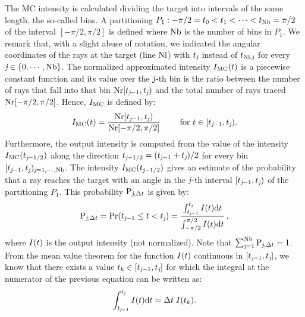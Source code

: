 The MC intensity is calculated dividing the target into intervals of the same length, the so-called bins. A partitioning
$P_1: -\pi/2 = t_{0}<t_{1}<\cdots <t_{\textrm{Nb}}=\pi/2$ of the interval $[-\pi/2, \pi/2]$ is defined where $\textrm{Nb}$ is the number of bins in $P_1$.
We remark that, with a slight abuse of notation, we indicated the angular coordinates of the rays at the target (line $\textrm{Nl}$) with $t_{\textit{j}}$ instead of $t_{\textrm{Nl},\textit{j}}$ for every $\textit{j}\in\{0, \cdots, \textrm{Nb}\}$.
The normalized approximated intensity $I_{\textrm{MC}}(t)$ is a piecewise constant function and its value over the $\textit{j}$-th bin is the ratio between the number of rays that fall into that bin
$\textrm{Nr}[t_{\textit{j}-1},t_{\textit{j}})$ and the total number of rays traced $\textrm{Nr}[-\pi/2, \pi/2]$.
Hence, $I_{\textrm{MC}}$ is defined by:
\begin{equation} \label{g_mc}
I_{\textrm{MC}}(t) = \frac{\textrm{Nr}[t_{\textit{j}-1},t_{\textit{j}})}{\textrm{Nr}[-\pi/2, \pi/2]} \qquad \mbox{ for } t\in[t_{\textit{j}-1}, t_{\textit{j}}).
\end{equation}
Furthermore, the output intensity is computed from the value of the intensity $I_{\textrm{MC}}(t_{\textit{j}-1/2})$ along the direction $t_{\textit{j}-1/2}=(t_{\textit{j}-1}+
t_{\textit{j}})/2$ for every bin $[t_{\textit{j}-1},t_{\textit{j}})_{\textit{j} = 1, \cdots, \textrm{Nb}}$.
 The intensity $I_{\textrm{MC}}(t_{\textit{j}-1/2})$ gives an estimate of the probability that a ray reaches the target with an angle in the $\textit{j}$-th interval
$[t_{\textit{j}-1}, t_{\textit{j}})$ of the partitioning $P_1$. This probability $\textrm{P}_{\textit{j}, \Delta t}$ is given by:
\begin{equation}\label{eq:probability}
\textrm{P}_{\textit{j}, \Delta t} = \Pr(t_{\textit{j}-1}\leq t<t_{\textit{j}})=
\frac{\int_{t_{\textit{j}-1}}^{t_{\textit{j}}} I(t) \textrm{d}t}{\int_{-\pi/2}^{\pi/2}I(t) \textrm{d}t}\,,
\end{equation}
where $I(t)$ is the output intensity (not normalized).
Note that $\sum_{\textit{j}=1}^{\textrm{Nb}}\textrm{P}_{\textit{j}, \Delta t}=1$. From the mean value theorem for the function
$I(t)$ continuous in $[t_{\textit{j}-1}, t_{\textit{j}}]$, we know that there exists a value $t_{k}\in[t_{\textit{j}-1}, t_{\textit{j}}]$ for which the integral at the numerator of the previous equation can be written as: \begin{equation}
\int_{t_{\textit{j}-1}}^{t_{\textit{j}}} I(t) \textrm{d}t = \Delta t\;I(t_{k}).
\end{equation}
